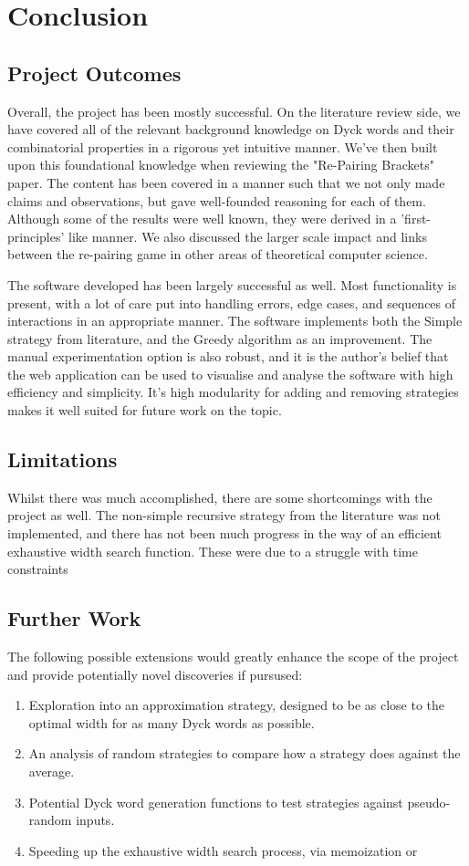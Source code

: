 \chapter{Conclusion}

\section{Project Outcomes}
Overall, the project has been mostly successful. On the literature review side, we have covered all of the relevant background knowledge on Dyck words and their combinatorial properties in a rigorous yet intuitive manner. We've then built upon this foundational knowledge when reviewing the "Re-Pairing Brackets" paper. The content has been covered in a manner such that we not only made claims and observations, but gave well-founded reasoning for each of them. Although some of the results were well known, they were derived in a 'first-principles' like manner. We also discussed the larger scale impact and links between the re-pairing game in other areas of theoretical computer science.

The software developed has been largely successful as well. Most functionality is present, with a lot of care put into handling errors, edge cases, and sequences of interactions in an appropriate manner. The software implements both the Simple strategy from literature, and the Greedy algorithm as an improvement. The manual experimentation option is also robust, and it is the author's belief that the web application can be used to visualise and analyse the software with high efficiency and simplicity. It's high modularity for adding and removing strategies makes it well suited for future work on the topic.

\section{Limitations}
Whilst there was much accomplished, there are some shortcomings with the project as well. The non-simple recursive strategy from the literature was not implemented, and there has not been much progress in the way of an efficient exhaustive width search function. These were due to a struggle with time constraints 

\section{Further Work}
The following possible extensions would greatly enhance the scope of the project and provide potentially novel discoveries if pursused:

\begin{enumerate}
    \item Exploration into an approximation strategy, designed to be as close to the optimal width for as many Dyck words as possible.
    \item An analysis of random strategies to compare how a strategy does against the average.
    \item Potential Dyck word generation functions to test strategies against pseudo-random inputs.
    \item Speeding up the exhaustive width search process, via memoization or 
\end{enumerate}
